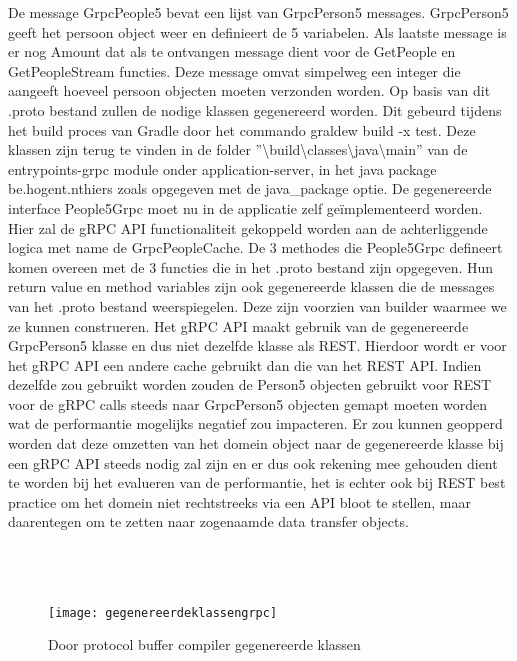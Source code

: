 De message GrpcPeople5 bevat een lijst van GrpcPerson5 messages. GrpcPerson5 geeft het persoon object weer en definieert de 5 variabelen. Als laatste message is er nog
Amount dat als te ontvangen message dient voor de GetPeople en GetPeopleStream functies. Deze message omvat simpelweg een integer die aangeeft hoeveel persoon objecten moeten
verzonden worden.\newline
Op basis van dit .proto bestand zullen de nodige klassen gegenereerd worden. Dit gebeurd tijdens het build proces van Gradle door het commando graldew build -x test.
Deze klassen zijn terug te vinden in de folder ''\textbackslash{}build\textbackslash{}classes\textbackslash{}java\textbackslash{}main'' van de entrypoints-grpc module onder application-server,
in het java package be.hogent.nthiers zoals opgegeven met de java\_package optie. De gegenereerde interface People5Grpc moet nu in de applicatie zelf geïmplementeerd worden.
Hier zal de gRPC API functionaliteit gekoppeld worden aan de achterliggende logica met name de GrpcPeopleCache. De 3 methodes die People5Grpc defineert komen overeen met de 3 functies die
in het .proto bestand zijn opgegeven. Hun return value en method variables zijn ook gegenereerde klassen die de messages van het .proto bestand weerspiegelen.
Deze zijn voorzien van builder waarmee we ze kunnen construeren.\newline
Het gRPC API maakt gebruik van de gegenereerde GrpcPerson5 klasse en dus niet dezelfde klasse als REST. Hierdoor wordt er voor het gRPC API een andere cache gebruikt dan
die van het REST API. Indien dezelfde zou gebruikt worden zouden de Person5 objecten gebruikt voor REST voor de gRPC calls steeds naar GrpcPerson5 objecten gemapt moeten worden
wat de performantie mogelijks negatief zou impacteren. Er zou kunnen geopperd worden dat deze omzetten van het domein object naar de gegenereerde klasse bij een gRPC API steeds nodig
zal zijn en er dus ook rekening mee gehouden dient te worden bij het evalueren van de performantie, het is echter ook bij REST best practice om het domein niet rechtstreeks
via een API bloot te stellen, maar daarentegen om te zetten naar zogenaamde data transfer objects.\newline
~\autocite{quarkusgRPC}\\
~\autocite{DTO}\\
~\autocite{gRPCBestPractices}\\
~\autocite{builderPattern}\\

\begin{figure}[ht]
    \centering
    \texttt{[image: gegenereerdeklassengrpc]}
    \caption{Door protocol buffer compiler gegenereerde klassen}
\end{figure}

